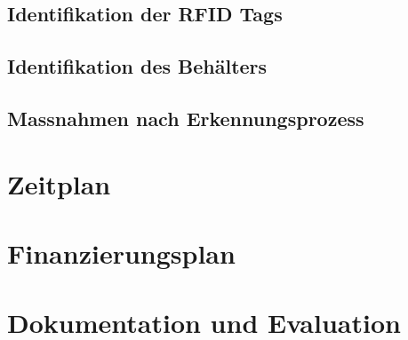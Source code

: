 \section{Identifikation der RFID Tags}

\section{Identifikation des Behälters}

\section{Massnahmen nach Erkennungsprozess}

\chapter{Zeitplan}

\chapter{Finanzierungsplan}

\chapter{Dokumentation und Evaluation}